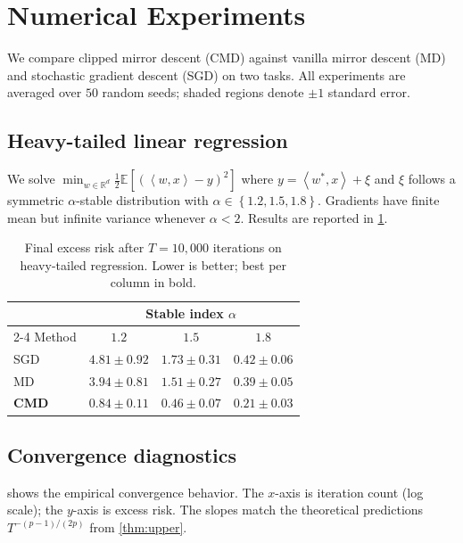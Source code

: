 \documentclass[11pt,a4paper]{article}
\theoremstyle{plain}
\theoremstyle{definition}
\theoremstyle{remark}
\newcommand{\R}{\mathbb{R}}
\newcommand{\E}{\mathbb{E}}
\newcommand{\inner}[2]{\left\langle#1,#2\right\rangle}
\newcommand{\set}[1]{\left\{#1\right\}}
\begin{document}
\section{Numerical Experiments}
\label{sec:exp}

We compare clipped mirror descent (CMD) against vanilla mirror descent (MD)
and stochastic gradient descent (SGD) on two tasks. All experiments are
averaged over $50$ random seeds; shaded regions denote $\pm 1$ standard error.

\subsection{Heavy-tailed linear regression}

We solve $\min_{w \in \R^d} \tfrac{1}{2} \E[(\inner{w}{x} - y)^2]$ where
$y = \inner{w^*}{x} + \xi$ and $\xi$ follows a symmetric $\alpha$-stable
distribution with $\alpha \in \set{1.2, 1.5, 1.8}$. Gradients have finite mean
but infinite variance whenever $\alpha < 2$. Results are reported in
\cref{tab:regression}.

\begin{table}[t]
\centering
\caption{Final excess risk after $T = 10{,}000$ iterations on heavy-tailed
regression. Lower is better; best per column in bold.}
\label{tab:regression}
\begin{tabular}{lccc}
\toprule
& \multicolumn{3}{c}{Stable index $\alpha$} \\
\cmidrule(lr){2-4}
Method & $1.2$ & $1.5$ & $1.8$ \\
\midrule
SGD          & $4.81 \pm 0.92$         & $1.73 \pm 0.31$         & $0.42 \pm 0.06$ \\
MD           & $3.94 \pm 0.81$         & $1.51 \pm 0.27$         & $0.39 \pm 0.05$ \\
\textbf{CMD} & $\mathbf{0.84 \pm 0.11}$ & $\mathbf{0.46 \pm 0.07}$ & $\mathbf{0.21 \pm 0.03}$ \\
\bottomrule
\end{tabular}
\end{table}

\subsection{Convergence diagnostics}

 shows the empirical convergence behavior. The $x$-axis
is iteration count (log scale); the $y$-axis is excess risk. The slopes match
the theoretical predictions $T^{-(p-1)/(2p)}$ from \cref{thm:upper}.
\end{document}

